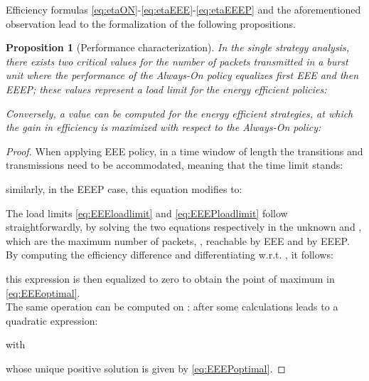 \documentclass[journal,10pt,twoside,final]{IEEEtran}
\newtheorem{proposition}{Proposition}
\begin{document}
\begin{figure*}[ht!]
\centering

\vspace{0.0cm}
\caption{Trace Real \#1. Efficiency comparison among different transmission strategies. The Always-On (ON), the EEE and the EEEP strategies are compared in terms of , and shown respectively in dark gray, gray, and light gray. When considering the EEEP policy, different values for  are shown.}
\label{fig:efficiency_scalingTprime}
\end{figure*}

Efficiency formulas \eqref{eq:etaON}-\eqref{eq:etaEEE}-\eqref{eq:etaEEEP} and the aforementioned observation lead to the formalization of the following propositions.
\begin{proposition} [Performance characterization] In the single strategy analysis, there exists two critical values for the number  of packets transmitted in a burst unit where the performance of the Always-On policy equalizes first EEE and then EEEP; 
these values represent a load limit for the energy efficient policies:


Conversely, a value  can be computed for the energy efficient strategies, at which the gain in efficiency is maximized with respect to the Always-On policy: 




\label{prop:prop1}
\end{proposition}
\begin{proof}
When applying EEE policy, in a time window of length  the  transitions and transmissions need to be accommodated, meaning that the time limit stands: 

similarly, in the EEEP case, this equation modifies to:

The load limits \eqref{eq:EEEloadlimit} and \eqref{eq:EEEPloadlimit} follow straightforwardly, by solving the two equations respectively in the unknown  and , which are the maximum number of packets, , reachable by EEE and by EEEP.\\
By computing the efficiency difference  and differentiating w.r.t. , it follows:


this expression is then equalized to zero to obtain the point of maximum  in \eqref{eq:EEEoptimal}.\\
The same operation can be computed on :  after some calculations leads to a quadratic expression:

with

whose unique positive solution is given by \eqref{eq:EEEPoptimal}.
\end{proof}
\end{document}
